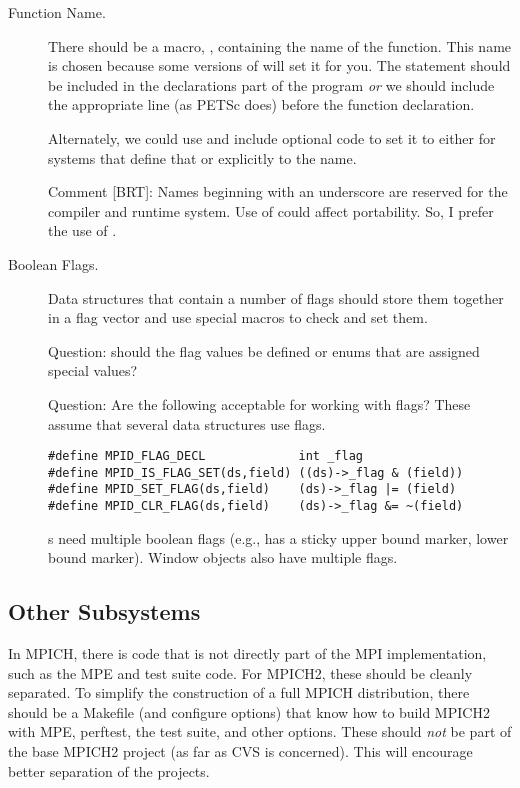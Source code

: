 \documentclass{article}
\begin{document}
\begin{description}
\item[Function Name.]
There should be a macro, , containing the name of the
function.  This name is chosen because some versions of  will set it
for you.  The statement  should be included
in the declarations part of the program \emph{or} we should include the
appropriate  line (as PETSc does) before the function
declaration. 

Alternately, we could use  and include optional code to
set it to either  for systems that define that or
explicitly to the name.

Comment [BRT]: Names beginning with an underscore are reserved for the
compiler and runtime system.  Use of  could affect
portability.  So, I prefer the use of .

\item[Boolean Flags.]
Data structures that contain a number of flags should store them
together in a flag vector and use special macros to check and set
them.  

Question: should the flag values be defined or enums that are assigned
special values?

Question: Are the following acceptable for working with flags?  These
assume that several data structures use flags.
\begin{verbatim}
#define MPID_FLAG_DECL             int _flag
#define MPID_IS_FLAG_SET(ds,field) ((ds)->_flag & (field))
#define MPID_SET_FLAG(ds,field)    (ds)->_flag |= (field)
#define MPID_CLR_FLAG(ds,field)    (ds)->_flag &= ~(field)
\end{verbatim}
s need multiple boolean flags (e.g., has a
sticky upper bound marker, lower bound marker).  Window objects also
have multiple flags.

\end{description}

\subsection{Other Subsystems}
In MPICH, there is code that is not directly part of the MPI
implementation, such as the MPE and test suite code.  For MPICH2,
these should be cleanly separated.  To simplify the construction of a
full MPICH distribution, there should be a Makefile (and configure
options) that know how to build MPICH2 with MPE, perftest, the test
suite, and other options.  These should \emph{not} be part of the base
MPICH2 project (as far as CVS is concerned).  This will encourage
better separation of the projects.
\end{document}
